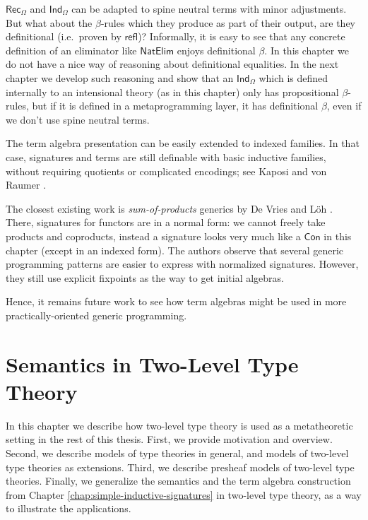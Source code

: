 \documentclass[12pt,a4paper,twoside,openany]{book}
\theoremstyle{remark}
\theoremstyle{definition}
\newcommand{\ms}[1]{\mathsf{#1}}
\newcommand{\refl}{\mathsf{refl}}
\newcommand{\Con}{\mathsf{Con}}
\newcommand{\Rec}{\ms{Rec}}
\newcommand{\Ind}{\ms{Ind}}
\begin{document}

$\Rec_\Omega$ and $\Ind_\Omega$ can be adapted to spine neutral terms with minor
adjustments. But what about the $\beta$-rules which they produce as part of
their output, are they definitional (i.e.\ proven by $\refl$)? Informally, it is
easy to see that any concrete definition of an eliminator like $\ms{NatElim}$
enjoys definitional $\beta$. In this chapter we do not have a nice way of
reasoning about definitional equalities. In the next chapter we develop such
reasoning and show that an $\Ind_\Omega$ which is defined internally to an
intensional theory (as in this chapter) only has propositional $\beta$-rules,
but if it is defined in a metaprogramming layer, it has definitional $\beta$,
even if we don't use spine neutral terms.

The term algebra presentation can be easily extended to indexed families. In
that case, signatures and terms are still definable with basic inductive
families, without requiring quotients or complicated encodings; see Kaposi and
von Raumer \cite{mutualinductive}.

The closest existing work is \emph{sum-of-products} generics by De Vries and Löh
\cite{sop}. There, signatures for functors are in a normal form: we cannot
freely take products and coproducts, instead a signature looks very much like a
$\Con$ in this chapter (except in an indexed form). The authors observe that
several generic programming patterns are easier to express with normalized
signatures. However, they still use explicit fixpoints as the way to get initial
algebras.

Hence, it remains future work to see how term algebras might be used in more
practically-oriented generic programming.


\chapter{Semantics in Two-Level Type Theory}
\label{chap:2ltt}

In this chapter we describe how two-level type theory is used as a metatheoretic
setting in the rest of this thesis. First, we provide motivation and
overview. Second, we describe models of type theories in general, and models of
two-level type theories as extensions. Third, we describe presheaf models of
two-level type theories. Finally, we generalize the semantics and the term
algebra construction from Chapter \ref{chap:simple-inductive-signatures} in
two-level type theory, as a way to illustrate the applications.
\end{document}
